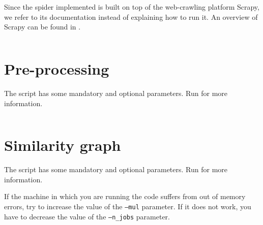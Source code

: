 Since the spider implemented is built on top of the web-crawling platform Scrapy, we refer to its documentation instead of explaining how to run it.
An overview of Scrapy can be found in \cite{kouzis2016learning}.

\inputminted{Python}{../code/random_spider.py}

\pagebreak
\section{Pre-processing} \label{preprocessing-code}
The script has some mandatory and optional parameters.
Run  for more information.

\inputminted{Python}{../code/preprocessing.py}

\pagebreak
\section{Similarity graph} \label{simgra}
The script has some mandatory and optional parameters.
Run  for more information.

If the machine in which you are running the code suffers from out of memory errors,
try to increase the value of the \texttt{--mul} parameter.
If it does not work, you have to decrease the value of the \texttt{--n\_jobs} parameter.

\inputminted{Python}{../code/similarity_graph.py}
